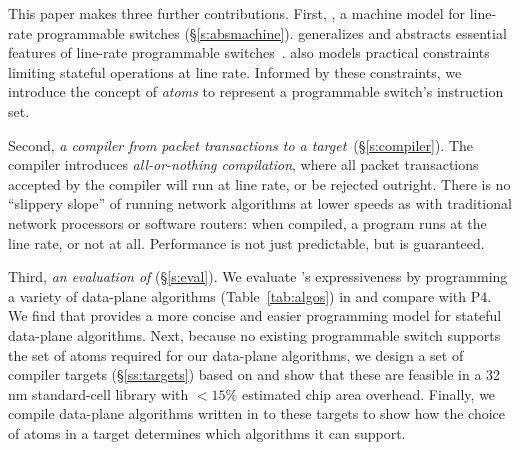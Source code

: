 This paper makes three further contributions. First, {\em
  \absmachine}, a machine model for line-rate programmable switches
(\S\ref{s:absmachine}). \absmachine generalizes and abstracts
essential features of line-rate programmable switches~\cite{rmt,
  xpliant, flexpipe}. \absmachine also models practical constraints
limiting stateful operations at line rate.  Informed by these
constraints, we introduce the concept of {\em atoms} to represent a
programmable switch's instruction set.

Second, {\em a compiler from \pktlanguage packet transactions to a
  \absmachine target}~(\S\ref{s:compiler}). The \pktlanguage compiler
introduces \textit{all-or-nothing compilation}, where all packet
transactions accepted by the compiler will run at line rate, or be
rejected outright. There is no ``slippery slope'' of running network
algorithms at lower speeds as with traditional network processors or
software routers: when compiled, a \pktlanguage program runs at the
line rate, or not at all. Performance is not just predictable, but
is guaranteed.

Third, {\em an evaluation of \pktlanguage} (\S\ref{s:eval}). We evaluate
\pktlanguage's expressiveness by programming a variety of data-plane
algorithms (Table~\ref{tab:algos}) in \pktlanguage and compare with
P4. We find that \pktlanguage provides a more concise and easier
programming model for stateful data-plane algorithms.  Next, because
no existing programmable switch supports the set of atoms required for
our data-plane algorithms, we design a set of compiler targets
(\S\ref{ss:targets}) based on \absmachine and show that these are
feasible in a 32 nm standard-cell library with $< 15\%$ estimated chip area
overhead.  Finally, we compile data-plane algorithms written in
\pktlanguage to these targets to show how the choice of atoms in a
target determines which algorithms it can support.

